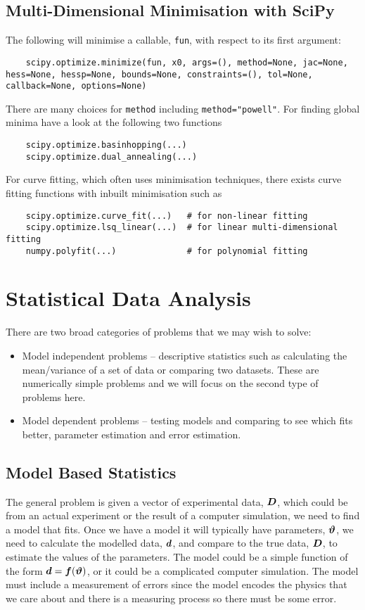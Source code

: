 \documentclass[a4paper]{article}
\begin{document}
    \subsection{Multi-Dimensional Minimisation with SciPy}
    The following will minimise a callable, \lstinline|fun|, with respect to its first argument:
    \begin{lstlisting}
    scipy.optimize.minimize(fun, x0, args=(), method=None, jac=None, hess=None, hessp=None, bounds=None, constraints=(), tol=None, callback=None, options=None)
    \end{lstlisting}
    There are many choices for \lstinline|method| including \lstinline|method="powell"|.
    For finding global minima have a look at the following two functions
    \begin{lstlisting}
    scipy.optimize.basinhopping(...)
    scipy.optimize.dual_annealing(...)
    \end{lstlisting}
    For curve fitting, which often uses minimisation techniques, there exists curve fitting functions with inbuilt minimisation such as
    \begin{lstlisting}
    scipy.optimize.curve_fit(...)   # for non-linear fitting
    scipy.optimize.lsq_linear(...)  # for linear multi-dimensional fitting
    numpy.polyfit(...)              # for polynomial fitting
    \end{lstlisting}
    
    \section{Statistical Data Analysis}
    There are two broad categories of problems that we may wish to solve:
    \begin{itemize}
        \item Model independent problems -- descriptive statistics such as calculating the mean/variance of a set of data or comparing two datasets.
        These are numerically simple problems and we will focus on the second type of problems here.
        \item Model dependent problems -- testing models and comparing to see which fits better, parameter estimation and error estimation.
    \end{itemize}
    
    \subsection{Model Based Statistics}
    The general problem is given a vector of experimental data, \(\bm{D}\), which could be from an actual experiment or the result of a computer simulation, we need to find a model that fits.
    Once we have a model it will typically have parameters, \(\bm{\vartheta}\), we need to calculate the modelled data, \(\bm{d}\), and compare to the true data, \(\bm{D}\), to estimate the values of the parameters.
    The model could be a simple function of the form \(\bm{d} = \bm{f}(\bm{\vartheta})\), or it could be a complicated computer simulation.
    The model must include a measurement of errors since the model encodes the physics that we care about and there is a measuring process so there must be some error.
    
\end{document}
